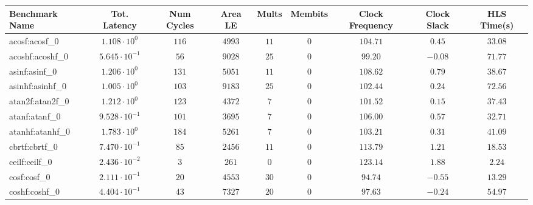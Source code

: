 \begin{tabular}{|l|c|c|c|c|c|c|c|c|}
\hline
Benchmark Name               & Tot. Latency            & Num Cycles & Area LE    & Mults   & Membits & Clock Frequency & Clock Slack & HLS Time(s) \\
\hline
acosf:acosf\_0               & $ 1.108 \cdot 10^{0}  $ & $ 116    $ & $ 4993   $ & $ 11  $ & $ 0   $ & $ 104.71      $ & $ 0.45    $ & $ 33.08   $ \\
acoshf:acoshf\_0             & $ 5.645 \cdot 10^{-1} $ & $ 56     $ & $ 9028   $ & $ 25  $ & $ 0   $ & $ 99.20       $ & $ -0.08   $ & $ 71.77   $ \\
asinf:asinf\_0               & $ 1.206 \cdot 10^{0}  $ & $ 131    $ & $ 5051   $ & $ 11  $ & $ 0   $ & $ 108.62      $ & $ 0.79    $ & $ 38.67   $ \\
asinhf:asinhf\_0             & $ 1.005 \cdot 10^{0}  $ & $ 103    $ & $ 9183   $ & $ 25  $ & $ 0   $ & $ 102.44      $ & $ 0.24    $ & $ 72.56   $ \\
atan2f:atan2f\_0             & $ 1.212 \cdot 10^{0}  $ & $ 123    $ & $ 4372   $ & $ 7   $ & $ 0   $ & $ 101.52      $ & $ 0.15    $ & $ 37.43   $ \\
atanf:atanf\_0               & $ 9.528 \cdot 10^{-1} $ & $ 101    $ & $ 3695   $ & $ 7   $ & $ 0   $ & $ 106.00      $ & $ 0.57    $ & $ 32.71   $ \\
atanhf:atanhf\_0             & $ 1.783 \cdot 10^{0}  $ & $ 184    $ & $ 5261   $ & $ 7   $ & $ 0   $ & $ 103.21      $ & $ 0.31    $ & $ 41.09   $ \\
cbrtf:cbrtf\_0               & $ 7.470 \cdot 10^{-1} $ & $ 85     $ & $ 2456   $ & $ 11  $ & $ 0   $ & $ 113.79      $ & $ 1.21    $ & $ 18.53   $ \\
ceilf:ceilf\_0               & $ 2.436 \cdot 10^{-2} $ & $ 3      $ & $ 261    $ & $ 0   $ & $ 0   $ & $ 123.14      $ & $ 1.88    $ & $ 2.24    $ \\
cosf:cosf\_0                 & $ 2.111 \cdot 10^{-1} $ & $ 20     $ & $ 4553   $ & $ 30  $ & $ 0   $ & $ 94.74       $ & $ -0.55   $ & $ 13.29   $ \\
coshf:coshf\_0               & $ 4.404 \cdot 10^{-1} $ & $ 43     $ & $ 7327   $ & $ 20  $ & $ 0   $ & $ 97.63       $ & $ -0.24   $ & $ 54.97   $ \\

\end{tabular}
